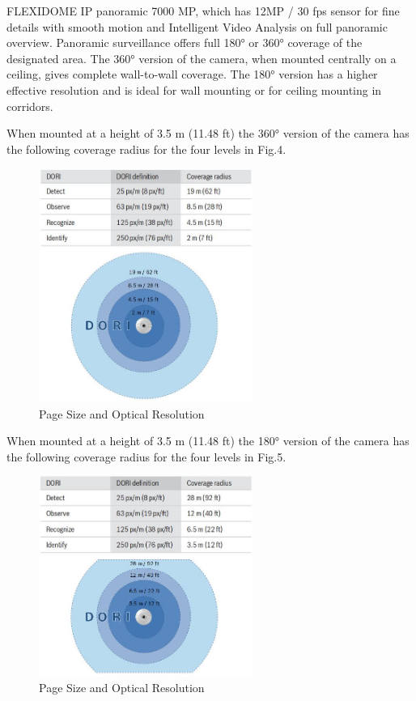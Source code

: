 FLEXIDOME IP panoramic 7000 MP, which has 12MP / 30 fps sensor for fine details with smooth motion and Intelligent Video Analysis on full panoramic overview. Panoramic surveillance offers full 180° or 360° coverage of the designated area. The 360° version of the camera, when mounted
centrally on a ceiling, gives complete wall-to-wall coverage. The 180° version has a higher effective resolution and is ideal for wall mounting or for ceiling
mounting in corridors.

When mounted at a height of 3.5 m (11.48 ft) the 360° version of the camera has the following coverage radius for the four levels in Fig.4.
\begin{figure}[htbp]
\centerline{\includegraphics[width=7cm,scale=0.8]{camera360.jpg}}
\caption{Page Size and Optical Resolution}
\label{fig}
\end{figure}

When mounted at a height of 3.5 m (11.48 ft) the 180° version of the camera has the following coverage radius for the four levels in Fig.5.
\begin{figure}[htbp]
\centerline{\includegraphics[width=7cm,scale=0.8]{camera180.jpg}}
\caption{Page Size and Optical Resolution}
\label{fig}
\end{figure}

